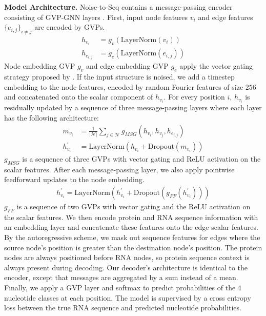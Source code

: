 \textbf{Model Architecture.} Noise-to-Seq contains a message-passing encoder consisting of GVP-GNN layers \cite{jing2020learning}. First, input node features $v_i$ and edge features $\{ e_{i,j} \}_{i \neq j}$ are encoded by GVPs.
\begin{align*}
h_{v_i} &= g_v ( \text{LayerNorm} (v_i) )  \\
h_{e_{i,j}} &= g_e ( \text{LayerNorm} (e_{i,j}) ) 
\end{align*}
Node embedding GVP $g_v$ and edge embedding GVP $g_e$ apply the vector gating strategy proposed by \citet{jing2021equivariant}. If the input structure is noised, we add a timestep embedding to the node features, encoded by random Fourier features of size $256$ \cite{tancik2020fourier} and concatenated onto the scalar component of $h_{v_i}$. For every position $i$, $h_{v_i}$ is residually updated by a sequence of three message-passing layers where each layer has the following architecture:
\begin{align*}
m_{v_i} &= \frac{1}{|\mathcal{N}|} \sum_{j \in \mathcal{N}} g_{MSG} (h_{v_i}, h_{v_j}, h_{e_{i,j}})  \\
h_{v_i}^{'} &= \text{LayerNorm} (h_{v_i} + \text{Dropout}(m_{v_i})) \label{update}
\end{align*}
$g_{MSG}$ is a sequence of three GVPs with vector gating and ReLU activation on the scalar features. After each message-passing layer, we also apply pointwise feedforward updates to the node embedding.
\begin{align*}
h_{v_i}^{'} = \text{LayerNorm} (h_{v_i}^{'} + \text{Dropout}(g_{FF}(h_{v_i}^{'})))
\end{align*}
$g_{FF}$ is a sequence of two GVPs with vector gating and the ReLU activation on the scalar features. We then encode protein and RNA sequence information with an embedding layer and concatenate these features onto the edge scalar features. By the autoregressive scheme, we mask out sequence features for edges where the source node's position is greater than the destination node's position. The protein nodes are always positioned before RNA nodes, so protein sequence context is always present during decoding. Our decoder's architecture is identical to the encoder, except that messages are aggregated by a sum instead of a mean. Finally, we apply a GVP layer and softmax to predict probabilities of the $4$ nucleotide classes at each position. The model is supervised by a cross entropy loss between the true RNA sequence and predicted nucleotide probabilities.

